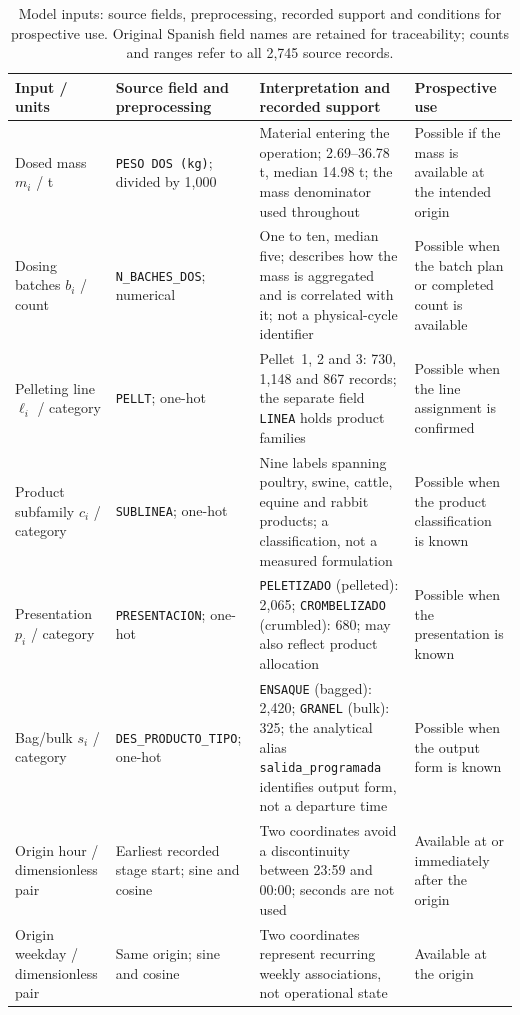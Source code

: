 \begin{table}[!htbp]\centering\footnotesize
\caption{Model inputs: source fields, preprocessing, recorded support and conditions for prospective use. Original Spanish field names are retained for traceability; counts and ranges refer to all 2,745 source records.}\label{tab:inputs}
\begin{tabularx}{\linewidth}{@{}>{\raggedright\arraybackslash}p{.15\linewidth}>{\raggedright\arraybackslash}p{.23\linewidth}>{\raggedright\arraybackslash}X>{\raggedright\arraybackslash}p{.21\linewidth}@{}}\toprule
Input / units & Source field and preprocessing & Interpretation and recorded support & Prospective use \\\midrule
Dosed mass $m_i$ / t & \texttt{PESO DOS (kg)}; divided by 1,000 & Material entering the operation; 2.69--36.78 t, median 14.98 t; the mass denominator used throughout & Possible if the mass is available at the intended origin \\\addlinespace
Dosing batches $b_i$ / count & \texttt{N\_BACHES\_DOS}; numerical & One to ten, median five; describes how the mass is aggregated and is correlated with it; not a physical-cycle identifier & Possible when the batch plan or completed count is available \\\addlinespace
Pelleting line $\ell_i$ / category & \texttt{PELLT}; one-hot & Pellet~1, 2 and 3: 730, 1,148 and 867 records; the separate field \texttt{LINEA} holds product families & Possible when the line assignment is confirmed \\\addlinespace
Product subfamily $c_i$ / category & \texttt{SUBLINEA}; one-hot & Nine labels spanning poultry, swine, cattle, equine and rabbit products; a classification, not a measured formulation & Possible when the product classification is known \\\addlinespace
Presentation $p_i$ / category & \texttt{PRESENTACION}; one-hot & \texttt{PELETIZADO} (pelleted): 2,065; \texttt{CROMBELIZADO} (crumbled): 680; may also reflect product allocation & Possible when the presentation is known \\\addlinespace
Bag/bulk $s_i$ / category & \texttt{DES\_PRODUCTO\_}\allowbreak\texttt{TIPO}; one-hot & \texttt{ENSAQUE} (bagged): 2,420; \texttt{GRANEL} (bulk): 325; the analytical alias \texttt{salida\_programada} identifies output form, not a departure time & Possible when the output form is known \\\addlinespace
Origin hour / dimensionless pair & Earliest recorded stage start; sine and cosine & Two coordinates avoid a discontinuity between 23:59 and 00:00; seconds are not used & Available at or immediately after the origin \\\addlinespace
Origin weekday / dimensionless pair & Same origin; sine and cosine & Two coordinates represent recurring weekly associations, not operational state & Available at the origin \\\bottomrule
\end{tabularx}
\end{table}

